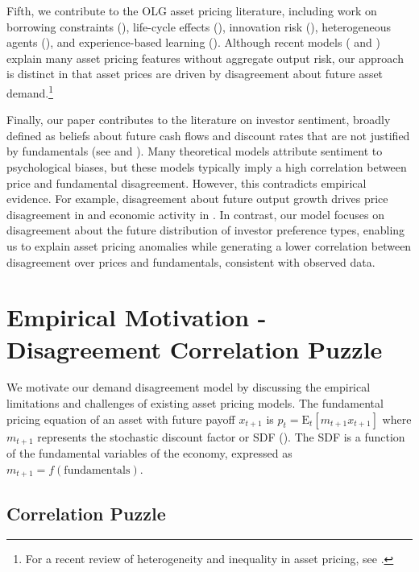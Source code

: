 \documentclass[preprint,11pt,authoryear]{elsarticle}
\theoremstyle{plain}
\begin{document}
Fifth, we contribute to the OLG asset pricing literature, including work on borrowing constraints (\cite{ConstantinidesDonaldsonMehra2002}), life-cycle effects (\cite{GOMES05}), innovation risk (\cite{GarlenauKoganPanageas2012}), heterogeneous agents (\cite{Garleanu2008}), and experience-based learning (\cite{EGH18}). Although recent models (\cite{GPcoordination:2021} and  \cite{GarlenauPanageas2023JPE}) explain many asset pricing features without aggregate output risk, our approach is distinct in that asset prices are driven by disagreement about future asset demand.\footnote{For a recent review of heterogeneity and inequality in asset pricing, see \cite{panageas:2020}.} 


Finally, our paper contributes to the literature on investor sentiment, broadly defined as beliefs about future cash flows and discount rates that are not justified by fundamentals (see \cite{BakerWurgler2007} and \cite{Zhou2018}). Many theoretical models attribute sentiment to psychological biases, but these models typically imply a high correlation between price and fundamental disagreement. However, this contradicts empirical evidence. For example, disagreement about future output growth drives price disagreement in \cite{Dumas2009} and economic activity in \cite{AngeletosLao2013}. In contrast, our model focuses on disagreement about the future distribution of investor preference types, enabling us to explain asset pricing anomalies while generating a lower correlation between disagreement over prices and fundamentals, consistent with observed data.


\section{Empirical Motivation - Disagreement Correlation Puzzle}\label{sec:empirics}

We motivate our demand disagreement model by discussing the empirical limitations and challenges of existing asset pricing models. The fundamental pricing equation of an asset with future payoff $x_{t+1}$ is $p_t = \mathrm{E}_t \left[ m_{t+1} x_{t+1} \right]$ 
where $m_{t+1}$ represents the stochastic discount factor or SDF (\cite{Cochrane2005}). The SDF is a function of the fundamental variables of the economy, expressed as $m_{t+1}  = f\left( \text{fundamentals}\right)$. 

\subsection{Correlation Puzzle}
\end{document}
